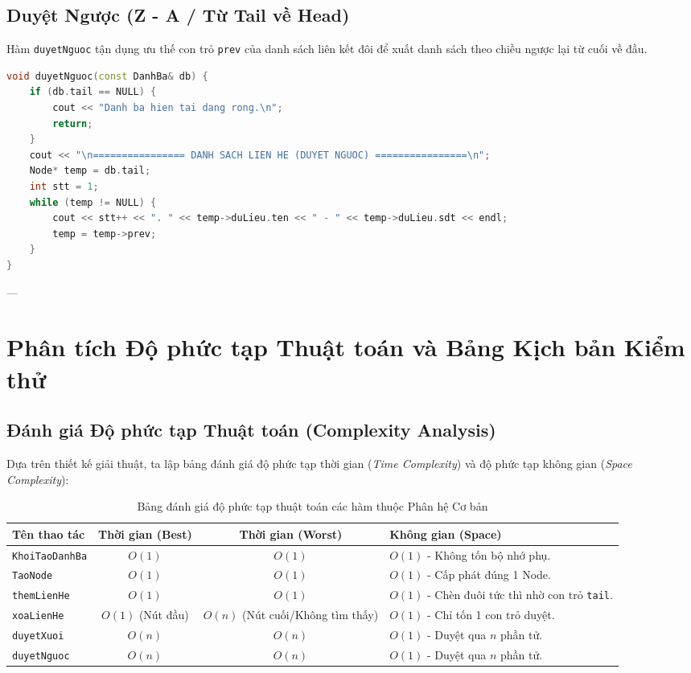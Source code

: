 \documentclass[12pt,a4paper]{report}
\begin{document}
\subsection{Duyệt Ngược (Z - A / Từ Tail về Head)}
Hàm \texttt{duyetNguoc} tận dụng ưu thế con trỏ \texttt{prev} của danh sách liên kết đôi để xuất danh sách theo chiều ngược lại từ cuối về đầu.

\begin{lstlisting}[language=C++, caption={Cài đặt hàm duyetNguoc}]
void duyetNguoc(const DanhBa& db) {
    if (db.tail == NULL) {
        cout << "Danh ba hien tai dang rong.\n";
        return;
    }
    cout << "\n================ DANH SACH LIEN HE (DUYET NGUOC) ================\n";
    Node* temp = db.tail;
    int stt = 1;
    while (temp != NULL) {
        cout << stt++ << ". " << temp->duLieu.ten << " - " << temp->duLieu.sdt << endl;
        temp = temp->prev;
    }
}
\end{lstlisting}

---

\section{Phân tích Độ phức tạp Thuật toán và Bảng Kịch bản Kiểm thử}

\subsection{Đánh giá Độ phức tạp Thuật toán (Complexity Analysis)}
Dựa trên thiết kế giải thuật, ta lập bảng đánh giá độ phức tạp thời gian (\textit{Time Complexity}) và độ phức tạp không gian (\textit{Space Complexity}):

\begin{table}[htbp]
    \centering
    \small
    \begin{tabular}{|l|c|c|p{6.5cm}|}
    \hline
    \textbf{Tên thao tác} & \textbf{Thời gian (Best)} & \textbf{Thời gian (Worst)} & \textbf{Không gian (Space)} \\ \hline
    \texttt{KhoiTaoDanhBa} & $O(1)$ & $O(1)$ & $O(1)$ - Không tốn bộ nhớ phụ. \\ \hline
    \texttt{TaoNode} & $O(1)$ & $O(1)$ & $O(1)$ - Cấp phát đúng 1 Node. \\ \hline
    \texttt{themLienHe} & $O(1)$ & $O(1)$ & $O(1)$ - Chèn đuôi tức thì nhờ con trỏ \texttt{tail}. \\ \hline
    \texttt{xoaLienHe} & $O(1)$ (Nút đầu) & $O(n)$ (Nút cuối/Không tìm thấy) & $O(1)$ - Chỉ tốn 1 con trỏ duyệt. \\ \hline
    \texttt{duyetXuoi} & $O(n)$ & $O(n)$ & $O(1)$ - Duyệt qua $n$ phần tử. \\ \hline
    \texttt{duyetNguoc} & $O(n)$ & $O(n)$ & $O(1)$ - Duyệt qua $n$ phần tử. \\ \hline
    \end{tabular}
    \caption{Bảng đánh giá độ phức tạp thuật toán các hàm thuộc Phân hệ Cơ bản}
\end{table}
\end{document}
